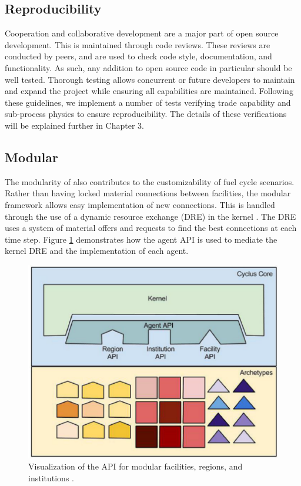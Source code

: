 \subsection{Reproducibility}
Cooperation and collaborative development are a major part of open source development. This is maintained through code reviews. These reviews are conducted by peers,
and are used to check code style, documentation, and functionality. As such, any addition to open source code in particular should be well tested.
Thorough testing allows concurrent or future developers to maintain and expand the project while ensuring all capabilities are maintained. Following these guidelines, we
implement a number of tests verifying trade capability and sub-process physics to ensure reproducibility. The details of these verifications will be explained further in Chapter 3.

\subsection{Modular}

The modularity of \Cyclus also contributes to the customizability of fuel cycle scenarios. Rather than having locked material connections between facilities, the modular
\Cyclus framework allows easy implementation of new connections. This is handled through the use of a dynamic resource exchange (DRE) in the \Cyclus kernel \cite{gidden_agent-based_2015}. 
The DRE uses a system of material offers and requests to find the best connections at each time step. Figure \ref{fig:cyc-api} demonstrates how the agent API is used to mediate
the \Cyclus kernel DRE and the implementation of each agent.  

\begin{figure}
	\centering
	\includegraphics[width=0.7\linewidth]{images/cyclus-core}
	\caption{Visualization of the \Cyclus API for modular facilities, regions, and institutions \cite{huff_fundamental_2016}.}
	\label{fig:cyc-api}
\end{figure}

